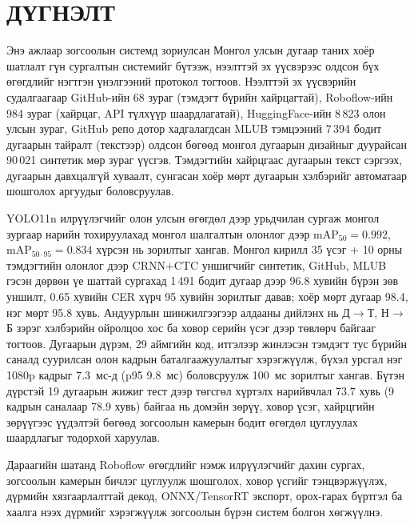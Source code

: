\chapter*{ДҮГНЭЛТ}
Энэ ажлаар зогсоолын системд зориулсан Монгол улсын дугаар таних хоёр шатлалт гүн сургалтын системийг бүтээж, нээлттэй эх үүсвэрээс олдсон бүх өгөгдлийг нэгтгэн үнэлгээний протокол тогтоов. Нээлттэй эх үүсвэрийн судалгаагаар GitHub-ийн 68 зураг (тэмдэгт бүрийн хайрцагтай), Roboflow-ийн 984 зураг (хайрцаг, API түлхүүр шаардлагатай), HuggingFace-ийн 8\,823 олон улсын зураг, GitHub репо дотор хадгалагдсан MLUB тэмцээний 7\,394 бодит дугаарын тайралт (текстээр) олдсон бөгөөд монгол дугаарын дизайныг дуурайсан 90\,021 синтетик мөр зураг үүсгэв. Тэмдэгтийн хайрцгаас дугаарын текст сэргээх, дугаарын давхцалгүй хуваалт, сунгасан хоёр мөрт дугаарын хэлбэрийг автоматаар шошголох аргуудыг боловсруулав.

YOLO11n илрүүлэгчийг олон улсын өгөгдөл дээр урьдчилан сургаж монгол зургаар нарийн тохируулахад монгол шалгалтын олонлог дээр mAP$_{50}=0.992$, mAP$_{50\text{--}95}=0.834$ хүрсэн нь зорилтыг хангав. Монгол кирилл 35 үсэг + 10 орны тэмдэгтийн олонлог дээр CRNN+CTC уншигчийг синтетик, GitHub, MLUB гэсэн дөрвөн үе шаттай сургахад 1\,491 бодит дугаар дээр 96.8 хувийн бүрэн зөв уншилт, 0.65 хувийн CER хүрч 95 хувийн зорилтыг давав; хоёр мөрт дугаар 98.4, нэг мөрт 95.8 хувь. Андуурлын шинжилгээгээр алдааны дийлэнх нь Д$\to$Т, Н$\to$Б зэрэг хэлбэрийн ойролцоо хос ба ховор серийн үсэг дээр төвлөрч байгааг тогтоов. Дугаарын дүрэм, 29 аймгийн код, итгэлээр жинлэсэн тэмдэгт тус бүрийн саналд суурилсан олон кадрын баталгаажуулалтыг хэрэгжүүлж, бүхэл урсгал нэг 1080p кадрыг 7.3~мс-д (p95 9.8~мс) боловсруулж 100~мс зорилтыг хангав. Бүтэн дүрстэй 19 дугаарын жижиг тест дээр төгсгөл хүртэлх нарийвчлал 73.7 хувь (9 кадрын саналаар 78.9 хувь) байгаа нь домэйн зөрүү, ховор үсэг, хайрцгийн зөрүүгээс үүдэлтэй бөгөөд зогсоолын камерын бодит өгөгдөл цуглуулах шаардлагыг тодорхой харуулав.

Дараагийн шатанд Roboflow өгөгдлийг нэмж илрүүлэгчийг дахин сургах, зогсоолын камерын бичлэг цуглуулж шошголох, ховор үсгийг тэнцвэржүүлэх, дүрмийн хязгаарлалттай декод, ONNX/TensorRT экспорт, орох-гарах бүртгэл ба хаалга нээх дүрмийг хэрэгжүүлж зогсоолын бүрэн систем болгон хөгжүүлнэ.
